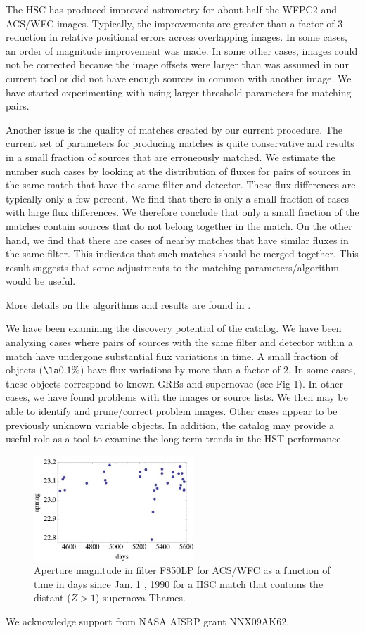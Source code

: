 The HSC has produced improved astrometry for about half the WFPC2 and ACS/WFC
images. 
Typically, the improvements are greater than a factor of 3 reduction in relative positional errors across overlapping
images.
In some cases, an order of magnitude improvement was made.
In some other cases, images could not be corrected because
the image offsets were larger than was assumed in our current tool or did not have enough sources in common 
with another image. We have started experimenting
with using larger threshold parameters for matching pairs.

Another issue is the quality of matches created by our current procedure.
The current set of parameters for producing matches is quite conservative
and results in a small fraction of sources that are erroneously matched. We estimate the number
such cases by looking at the distribution of fluxes for pairs of sources in the same
match that have the same filter and detector. These flux differences are typically only a few
percent. We find that there is only a small
fraction of cases with large flux differences.  We therefore conclude that only a small fraction
of the matches contain sources that do not belong together in the match. On
the other hand, we find that there are cases of nearby matches that have similar
fluxes in the same filter. This indicates that such matches should be merged together.
This result suggests that some adjustments to the matching parameters/algorithm would be useful.

More details on the algorithms and results are found in \cite{2012arXiv1206.0644B}.

We have been examining the discovery potential of the catalog. 
We have been analyzing cases where pairs of sources with the same filter and detector
within a match have undergone substantial flux variations in time. A small fraction of objects ($\la 0.1 \%$)
have flux variations by more than a factor of 2. In some cases, these    objects correspond
to known GRBs and supernovae (see Fig 1).  In other cases, we have found problems with
the images or source lists. We then may be able to identify and prune/correct problem
images. Other cases appear to be previously unknown variable objects.
In addition, the catalog may provide a useful role as a tool to examine the long term trends
in the HST performance.


\begin{figure}
\centering
\includegraphics[width=6.0cm]{part8/Lubow_O21/O21_1.eps}
\caption{Aperture magnitude in filter F850LP for ACS/WFC 
as a function of time in days since Jan. 1 , 1990 for a HSC match that contains 
the distant ($Z> 1$) supernova Thames.}
\end{figure}


\acknowledgements We acknowledge support from NASA AISRP grant NNX09AK62.


